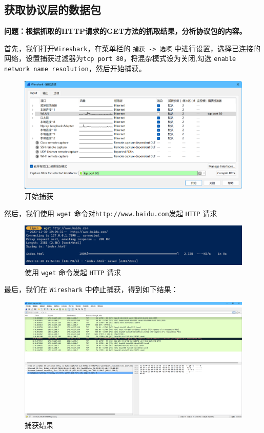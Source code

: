 \documentclass{article}
\begin{document}
\subsection{获取协议层的数据包}

\textbf{问题：根据抓取的HTTP请求的GET方法的抓取结果，分析协议包的内容。}

首先，我们打开\texttt{Wireshark}，在菜单栏的 \texttt{捕获 -> 选项} 中进行设置，选择已连接的网络，设置捕获过滤器为\texttt{tcp port 80}，将混杂模式设为关闭,勾选 \texttt{enable network  name resolution}，然后开始捕获。

\begin{figure}[H]
  \centering
  \includegraphics[width=15cm]{images/01.png}
  \caption{开始捕获}
\end{figure}

然后，我们使用 \texttt{wget} 命令对\texttt{http://www.baidu.com}发起 \texttt{HTTP} 请求

\begin{figure}[H]
  \centering
  \includegraphics[width=15cm]{images/02.png}
  \caption{使用 \texttt{wget} 命令发起 \texttt{HTTP} 请求}
\end{figure}

最后，我们在 \texttt{Wireshark} 中停止捕获，得到如下结果：

\begin{figure}[H]
  \centering
  \includegraphics[width=15cm]{images/03.png}
  \caption{捕获结果}
\end{figure}
\end{document}

